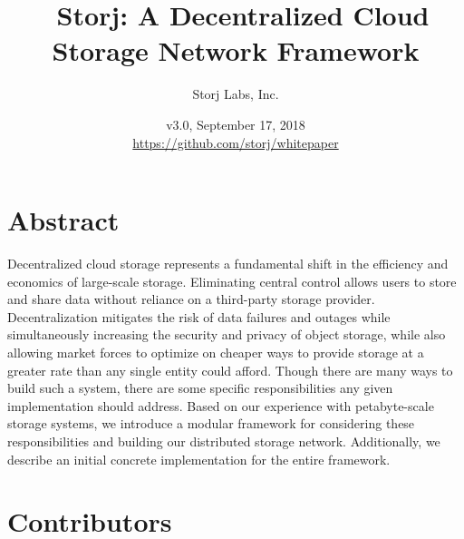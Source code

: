 \documentclass[11pt,fleqn,openany]{book}
\title{\textbf{\sffamily\color{white} \
Storj: A Decentralized Cloud Storage Network Framework}}
\author{\small\sffamily\color{white}
Storj Labs, Inc.}
\date{\small\sffamily\color{white} v3.0, September 17, 2018\\
\small\color{white}\url{https://github.com/storj/whitepaper}
}
\begin{document}
\thispagestyle{fancy}

\maketitle


\newpage

\tableofcontents\newpage

\section{Abstract}

Decentralized cloud storage represents a fundamental shift in
the efficiency and economics of large-scale storage.
Eliminating central control allows users to store and share data
without reliance on a third-party storage provider. Decentralization mitigates
the risk of data failures and outages while simultaneously increasing
the security and privacy of object storage, while also
allowing market forces to optimize on cheaper ways to
provide storage at a greater rate than any single entity could afford.
Though there are many ways to build such a system, there are some specific
responsibilities any given implementation should address.
Based on our experience with petabyte-scale
storage systems, we introduce a modular framework for considering these
responsibilities and building our distributed storage network.
Additionally, we describe an initial
concrete implementation for the entire framework.

\section{Contributors}
\end{document}
